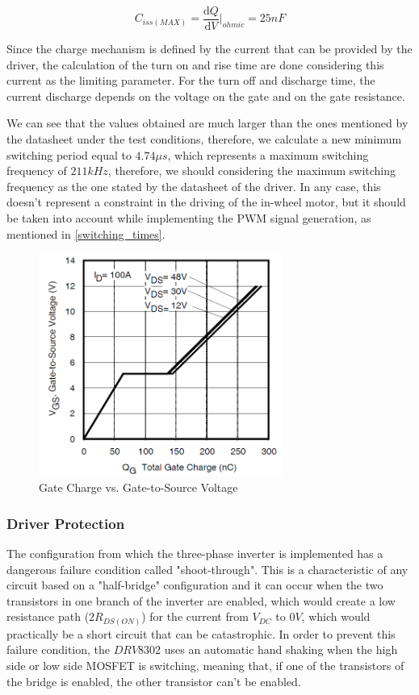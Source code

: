 \begin{equation}
	C_{iss(MAX)} = \frac{\mathrm{d} Q}{\mathrm{d} V}\bigg\rvert_{ohmic} = 25nF
\end{equation}

Since the charge mechanism is defined by the current that can be provided by the driver, the calculation of the turn on and rise time are done considering this current as the limiting parameter. For the turn off and discharge time, the current discharge depends on the voltage on the gate and on the gate resistance.

We can see that the values obtained are much larger than the ones mentioned by the datasheet under the test conditions, therefore, we calculate a new minimum switching period equal to $4.74\mu s$, which represents a maximum switching frequency of $211kHz$, therefore, we should considering the maximum switching frequency as the one stated by the datasheet of the driver. In any case, this doesn't represent a constraint in the driving of the in-wheel motor, but it should be taken into account while implementing the \ac{PWM} signal generation, as mentioned in \ref{switching_times}.

\begin{figure}[htbp]
\centering
\includegraphics[width=8cm]{Images/gate_charge.png} 
\caption[Gate Charge vs. Gate-to-Source Voltage]{Gate Charge vs. Gate-to-Source Voltage}
\label{fig:gatecharge}
\end{figure}

\subsubsection{Driver Protection}

The configuration from which the three-phase inverter is implemented has a dangerous failure condition called "shoot-through". This is a characteristic of any circuit based on a "half-bridge" configuration and it can occur when the two transistors in one branch of the inverter are enabled, which would create a low resistance path ($2R_{DS(ON)}$) for the current from $V_{DC}$ to $0V$, which would practically be a short circuit that can be catastrophic. In order to prevent this failure condition, the $DRV8302$ uses an automatic hand shaking when the high side or low side MOSFET is switching, meaning that, if one of the transistors of the bridge is enabled, the other transistor can't be enabled.

